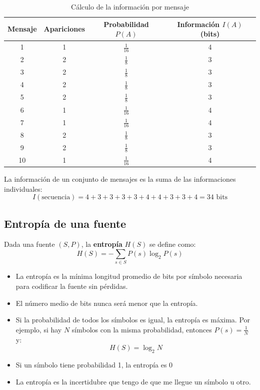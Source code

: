 \documentclass[11pt,a4paper]{article}
\begin{document}
\begin{table}[h!]
\centering
\caption{Cálculo de la información por mensaje}
\begin{tabular}{cccc}
\toprule
\textbf{Mensaje} & \textbf{Apariciones} & \textbf{Probabilidad $P(A)$} & \textbf{Información $I(A)$ (bits)} \\
\midrule
1  & 1 & $\tfrac{1}{16}$ & 4 \\
2  & 2 & $\tfrac{1}{8}$  & 3 \\
3  & 2 & $\tfrac{1}{8}$  & 3 \\
4  & 2 & $\tfrac{1}{8}$  & 3 \\
5  & 2 & $\tfrac{1}{8}$  & 3 \\
6  & 1 & $\tfrac{1}{16}$ & 4 \\
7  & 1 & $\tfrac{1}{16}$ & 4 \\
8  & 2 & $\tfrac{1}{8}$  & 3 \\
9  & 2 & $\tfrac{1}{8}$  & 3 \\
10 & 1 & $\tfrac{1}{16}$ & 4 \\
\bottomrule
\end{tabular}
\end{table}

La información de un conjunto de mensajes es la suma de las informaciones individuales:
\[
I(\text{secuencia}) = 4 + 3 + 3 + 3 + 3 + 4 + 4 + 3 + 3 + 4 = 34 \text{ bits}
\]

\subsection{Entropía de una fuente}

Dada una fuente $(S, P)$, la \textbf{entropía} $H(S)$ se define como:
\[
H(S) = - \sum_{s \in S} P(s) \log_2 P(s)
\]

\begin{itemize}
	\item La entropía es la mínima longitud promedio de bits por símbolo necesaria para codificar la fuente sin pérdidas.
	\item El número medio de bits nunca será menor que la entropía.
	\item Si la probabilidad de todos los símbolos es igual, la entropía es máxima. Por ejemplo, si hay $N$ símbolos con la misma probabilidad, entonces $P(s) = \frac{1}{N}$ y:
	\[H(S) = \log_2 N\]
	\item Si un símbolo tiene probabilidad 1, la entropía es 0
	\item La entropía es la incertidubre que tengo de que me llegue un símbolo u otro.
\end{itemize}
\end{document}
